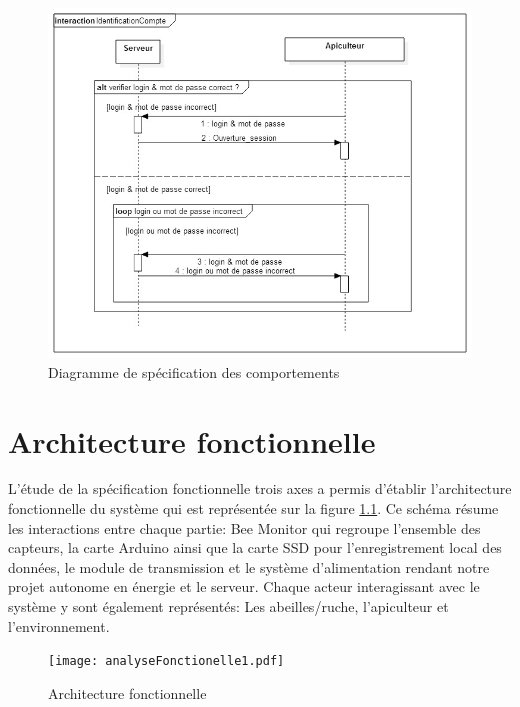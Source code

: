 \begin{figure}[h!]
\centering\includegraphics[scale=0.7]{IdentificationCompte.jpg}
\caption{\label{fig:sp_comp} Diagramme de spécification des comportements}
\end{figure}
\pagebreak

\chapter{Architecture fonctionnelle}

L'étude de la spécification fonctionnelle trois axes a permis d'établir l'architecture fonctionnelle du système qui est représentée sur la figure \ref{fig:anaFonc}.
Ce schéma résume les interactions entre chaque partie: Bee Monitor qui regroupe l'ensemble des capteurs, la carte Arduino ainsi que la carte SSD pour l'enregistrement local des données, le module de transmission et le système d'alimentation rendant notre projet autonome en énergie et le serveur. Chaque acteur interagissant avec le système y sont également représentés: Les abeilles/ruche, l'apiculteur et l'environnement.   
  

\begin{figure}[h]
\centering\texttt{[image: analyseFonctionelle1.pdf]}
\caption{\label{fig:anaFonc} Architecture fonctionnelle}
\end{figure}    

